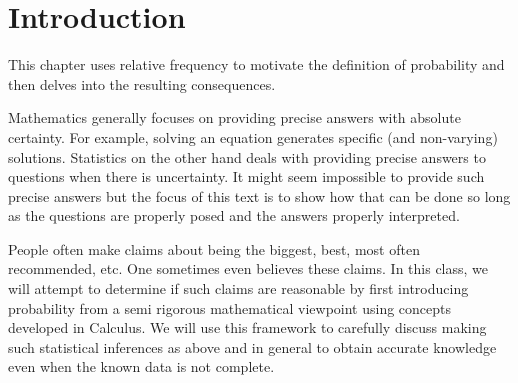 \documentclass[10pt,]{book}
\theoremstyle{plain}
\theoremstyle{definition}
\theoremstyle{definition}
\theoremstyle{definition}
\numberwithin{equation}{section}
\begin{document}
\section[{Introduction}]{Introduction}\label{section-19}
This chapter uses relative frequency to motivate the definition of probability and then delves into the resulting consequences.%
\par
Mathematics generally focuses on providing precise answers with absolute certainty. For example, solving an equation generates specific (and non-varying) solutions. Statistics on the other hand deals with providing precise answers to questions when there is uncertainty. It might seem impossible to provide such precise answers but the focus of this text is to show how that can be done so long as the questions are properly posed and the answers properly interpreted.%
\par
People often make claims about being the biggest, best, most often recommended, etc. One sometimes even believes these claims. In this class, we will attempt to determine if such claims are reasonable by first introducing probability from a semi rigorous mathematical viewpoint using concepts developed in Calculus. We will use this framework to carefully discuss making such statistical inferences as above and in general to obtain accurate knowledge even when the known data is not complete. %
\typeout{************************************************}
\typeout{************************************************}
\end{document}
